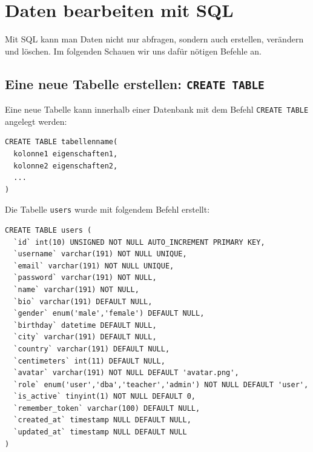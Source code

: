 \section{Daten bearbeiten mit \texorpdfstring{\gls{SQL}}{SQL}}
Mit SQL kann man Daten nicht nur abfragen, sondern auch erstellen, verändern und löschen. Im folgenden Schauen wir uns dafür nötigen Befehle an.

\subsection{Eine neue Tabelle erstellen: \texorpdfstring{\lstinline|CREATE TABLE|}{CREATE TABLE}}
\label{subsec:create-table}
Eine neue Tabelle kann innerhalb einer Datenbank mit dem Befehl \lstinline|CREATE TABLE| angelegt werden:

\begin{lstlisting}
CREATE TABLE tabellenname(
  kolonne1 eigenschaften1,
  kolonne2 eigenschaften2,
  ...
)
\end{lstlisting}

\begin{myexample}
\label{ex:sql-create}
Die Tabelle \texttt{users} wurde mit folgendem Befehl erstellt:

\begin{lstlisting}
CREATE TABLE users (
  `id` int(10) UNSIGNED NOT NULL AUTO_INCREMENT PRIMARY KEY,
  `username` varchar(191) NOT NULL UNIQUE,
  `email` varchar(191) NOT NULL UNIQUE,
  `password` varchar(191) NOT NULL,
  `name` varchar(191) NOT NULL,
  `bio` varchar(191) DEFAULT NULL,
  `gender` enum('male','female') DEFAULT NULL,
  `birthday` datetime DEFAULT NULL,
  `city` varchar(191) DEFAULT NULL,
  `country` varchar(191) DEFAULT NULL,
  `centimeters` int(11) DEFAULT NULL,
  `avatar` varchar(191) NOT NULL DEFAULT 'avatar.png',
  `role` enum('user','dba','teacher','admin') NOT NULL DEFAULT 'user',
  `is_active` tinyint(1) NOT NULL DEFAULT 0,
  `remember_token` varchar(100) DEFAULT NULL,
  `created_at` timestamp NULL DEFAULT NULL,
  `updated_at` timestamp NULL DEFAULT NULL
)
\end{lstlisting}
\end{myexample}

